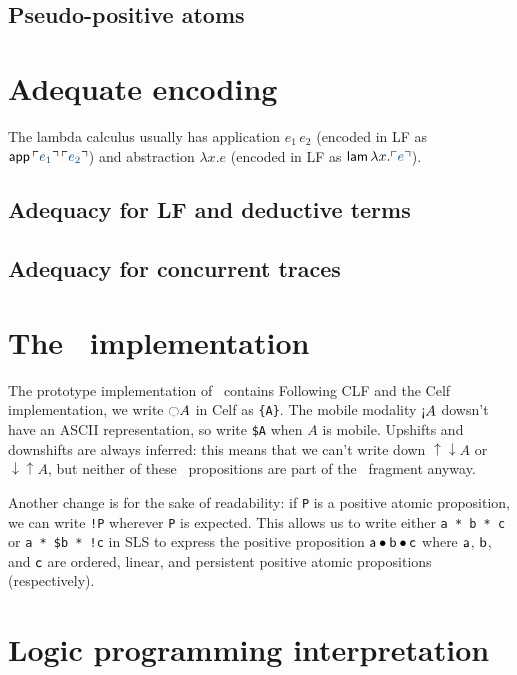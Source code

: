 \subsection{Pseudo-positive atoms}
\label{sec:pseudopositive}

\section{Adequate encoding}

The lambda
calculus usually has application $e_1\,e_2$ (encoded in LF as ${\sf
  app}\,\interp{e_1}\,\interp{e_2}$) and abstraction $\lambda x.e$
(encoded in LF as ${\sf lam}\,\lambda x. \interp{e}$). 

\subsection{Adequacy for LF and deductive terms}

\subsection{Adequacy for concurrent traces}


\section{The \sls~implementation}
\label{sec:prototype}

The prototype implementation of \sls~contains 
Following CLF and the Celf implementation, we write ${\ocircle}A$ in
Celf as \verb|{A}|. The mobile modality ${\gnab}A$ dowsn't have an
ASCII representation, so write \verb|$A| when $A$ is
mobile. Upshifts and downshifts are always inferred: this means that
we can't write down ${\uparrow}{\downarrow}A$ or
${\downarrow}{\uparrow}A$, but neither of these \ollll~propositions
are part of the \sls~fragment anyway.

Another change is for the sake of readability: if \verb|P| is a
positive atomic proposition, we can write \verb|!P| wherever \verb|P|
is expected. This allows us to write either \verb|a * b * c| or
\verb|a * $b * !c| in SLS to express the positive proposition ${\sf a}
\mathbin{\bullet} {\sf b} \mathbin{\bullet} {\sf c}$ where ${\sf a}$, ${\sf b}$, and ${\sf c}$
are ordered, linear, and persistent positive atomic propositions
(respectively).

\section{Logic programming interpretation}
\label{sec:framework-logicprog}

